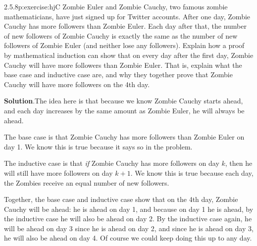 \documentclass[twoside,11pt,]{book}
\newcommand{\blocktitlefont}{\relax}
\numberwithin{equation}{chapter}
\begin{document}
\begin{divisionsolution}{2.5.8}{}{p:exercise:hjC}%
Zombie Euler and Zombie Cauchy, two famous zombie mathematicians, have just signed up for Twitter accounts. After one day, Zombie Cauchy has more followers than Zombie Euler. Each day after that, the number of new followers of Zombie Cauchy is exactly the same as the number of new followers of Zombie Euler (and neither lose any followers). Explain how a proof by mathematical induction can show that on every day after the first day, Zombie Cauchy will have more followers than Zombie Euler. That is, explain what the base case and inductive case are, and why they together prove that Zombie Cauchy will have more followers on the 4th day.%
\par\smallskip%
\noindent\textbf{\blocktitlefont Solution}.\quad{}The idea here is that because we know Zombie Cauchy starts ahead, and each day increases by the same amount as Zombie Euler, he will always be ahead.%
\par
The base case is that Zombie Cauchy has more followers than Zombie Euler on day 1. We know this is true because it says so in the problem.%
\par
The inductive case is that \emph{if} Zombie Cauchy has more followers on day \(k\), then he will still have more followers on day \(k+1\). We know this is true because each day, the Zombies receive an equal number of new followers.%
\par
Together, the base case and inductive case show that on the 4th day, Zombie Cauchy will be ahead: he is ahead on day 1, and because on day 1 he is ahead, by the inductive case he will also be ahead on day 2. By the inductive case again, he will be ahead on day 3 since he is ahead on day 2, and since he is ahead on day 3, he will also be ahead on day 4. Of course we could keep doing this up to any day.%
\end{divisionsolution}%
\end{document}
